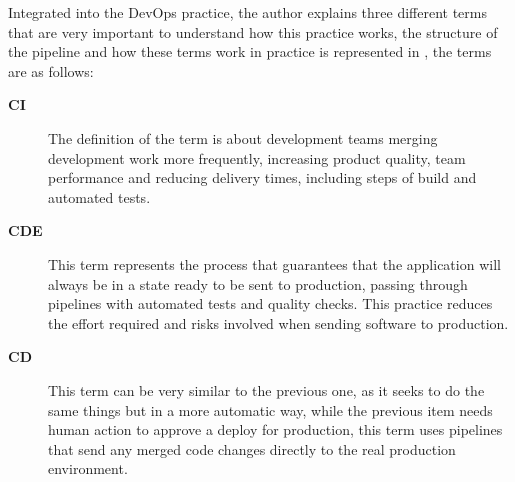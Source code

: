 Integrated into the \ac{DevOps} practice, the author \textcite{Shahin_2017} explains three different terms that are very important to understand how this practice works, the structure of the pipeline and how these terms work in practice is represented in , the terms are as follows:

\begin{description}
    
    \item[\textbf{\ac{CI}}] The definition of the term is about development teams merging development work more frequently, increasing product quality, team performance and reducing delivery times, including steps of build and automated tests.
    
    
    \item[\textbf{\ac{CDE}}] This term represents the process that guarantees that the application will always be in a state ready to be sent to production, passing through pipelines with automated tests and quality checks. This practice reduces the effort required and risks involved when sending software to production.
    
    \item[\textbf{\ac{CD}}] This term can be very similar to the previous one, as it seeks to do the same things but in a more automatic way, while the previous item needs human action to approve a deploy for production, this term uses pipelines that send any merged code changes directly to the real production environment.
\end{description} 

